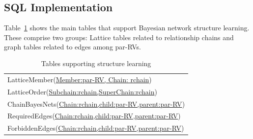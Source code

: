 \subsection{SQL Implementation}

Table~\ref{table:laj-tables} shows the main tables that support Bayesian network structure learning. These comprise two groups: Lattice tables related to relationship chains and graph tables related to edges among par-RVs.  


\begin{table}[tbp]
\caption{Tables supporting structure learning}
 \centering
 \begin{tabular}
[c]{|l|}\hline
LatticeMember(\underline{Member:par-RV, Chain: rchain})\\
LatticeOrder(\underline{Subchain:rchain,SuperChain:rchain})\\
ChainBayesNets(\underline{Chain:rchain,child:par-RV,parent:par-RV})\\
RequiredEdges(\underline{Chain:rchain,child:par-RV,parent:par-RV})\\
ForbiddenEdges(\underline{Chain:rchain,child:par-RV,parent:par-RV})\\
\hline
\end{tabular}
\label{table:laj-tables}
\end{table}
 



\begin{table}[htp]
\begin{center}
\caption{The Lattice tables}
\label{tab:lattice-table}
\end{center}
\end{table}

